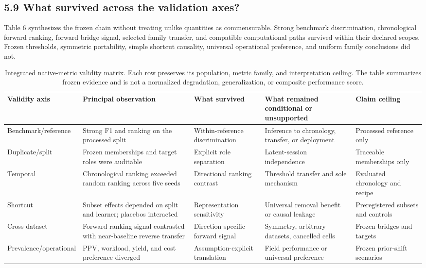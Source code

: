 \documentclass[preprint,12pt]{elsarticle}
\begin{document}
\subsection{5.9 What survived across the validation axes?}
Table 6 synthesizes the frozen chain without treating unlike quantities as commensurable. Strong benchmark discrimination, chronological forward ranking, forward bridge signal, selected family transfer, and compatible computational paths survived within their declared scopes. Frozen thresholds, symmetric portability, simple shortcut causality, universal operational preference, and uniform family conclusions did not.
\begin{table}[htbp]
\centering
\tiny
\setlength{\tabcolsep}{2pt}
\renewcommand{\arraystretch}{0.82}
\caption{Integrated native-metric validity matrix. Each row preserves its population, metric family, and interpretation ceiling. The table summarizes frozen evidence and is not a normalized degradation, generalization, or composite performance score.}
\begin{tabularx}{\textwidth}{@{}XXXXX@{}}
\toprule
Validity axis & Principal observation & What survived & What remained conditional or unsupported & Claim ceiling \\
\midrule
Benchmark/reference & Strong F1 and ranking on the processed split & Within-reference discrimination & Inference to chronology, transfer, or deployment & Processed reference only \\
Duplicate/split & Frozen memberships and target roles were auditable & Explicit role separation & Latent-session independence & Traceable memberships only \\
Temporal & Chronological ranking exceeded random ranking across five seeds & Directional ranking contrast & Threshold transfer and sole mechanism & Evaluated chronology and recipe \\
Shortcut & Subset effects depended on split and learner; placebos interacted & Representation sensitivity & Universal removal benefit or causal leakage & Preregistered subsets and controls \\
Cross-dataset & Forward ranking signal contrasted with near-baseline reverse transfer & Direction-specific forward signal & Symmetry, arbitrary datasets, cancelled cells & Frozen bridges and targets \\
Prevalence/operational & PPV, workload, yield, and cost preference diverged & Assumption-explicit translation & Field performance or universal preference & Frozen prior-shift scenarios \\

\end{tabularx}
\end{table}
\end{document}

